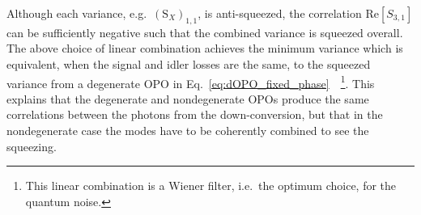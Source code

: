 Although each variance, e.g.\ $(\text{S}_X)_{1,1}$, is anti-squeezed, the correlation $\text{Re}[S_{3,1}]$ can be sufficiently negative such that the combined variance is squeezed overall. The above choice of linear combination achieves the minimum variance which is equivalent, when the signal and idler losses are the same, to the squeezed variance from a degenerate OPO in Eq.~\ref{eq:dOPO_fixed_phase}~\cite{ma_2017}~\footnote{This linear combination is a Wiener filter, i.e.\ the optimum choice, for the quantum noise.}.
This explains that the degenerate and nondegenerate OPOs produce the same correlations between the photons from the down-conversion, but that in the nondegenerate case the modes have to be coherently combined to see the squeezing. %



